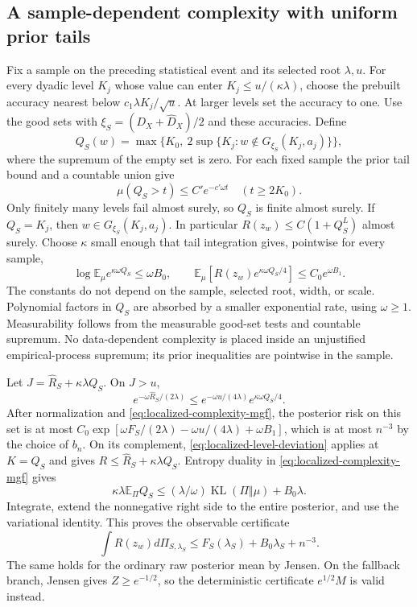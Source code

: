 \subsection{A sample-dependent complexity with uniform prior tails}
Fix a sample on the preceding statistical event and its selected root
$\lambda,u$. For every dyadic level $K_j$ whose value can enter
$K_j\le u/(\kappa\lambda)$, choose the prebuilt accuracy nearest below
$c_1\lambda K_j/\sqrt u$. At larger levels set the accuracy to one.
Use the good sets with $\xi_S=(D_X+\widehat D_X)/2$ and these accuracies.
Define
\[
 Q_S(w)=\max\{K_0,\ 2\sup\{K_j:w\notin G_{\xi_S}(K_j,a_j)\}\},
\]
where the supremum of the empty set is zero. For each fixed sample the
prior tail bound and a countable union give
\[
 \mu(Q_S>t)\le C'e^{-c'\omega t}\quad(t\ge2K_0).
\]
Only finitely many levels fail almost surely, so $Q_S$ is finite
almost surely. If $Q_S=K_j$, then $w\in G_{\xi_S}(K_j,a_j)$.
In particular $R(z_w)\le C(1+Q_S^L)$ almost surely.
Choose $\kappa$ small enough that tail integration gives, pointwise
for every sample,
\begin{equation}
 \log\mathbb E_\mu e^{\kappa\omega Q_S}\le\omega B_0,
 \qquad
 \mathbb E_\mu[R(z_w)e^{\kappa\omega Q_S/4}]
       \le C_0e^{\omega B_1}.
 \label{eq:localized-complexity-mgf}
\end{equation}
The constants do not depend on the sample, selected root, width, or
scale. Polynomial factors in $Q_S$ are absorbed by a smaller
exponential rate, using $\omega\ge1$.
Measurability follows from the measurable good-set tests and countable
supremum. No data-dependent complexity is placed inside an
unjustified empirical-process supremum; its prior inequalities are
pointwise in the sample.

Let $J=\widehat R_S+\kappa\lambda Q_S$. On $J>u$,
\[
 e^{-\omega\widehat R_S/(2\lambda)}
 \le e^{-\omega u/(4\lambda)}e^{\kappa\omega Q_S/4}.
\]
After normalization and \eqref{eq:localized-complexity-mgf}, the
posterior risk on this set is at most
$C_0\exp[\omega F_S/(2\lambda)-\omega u/(4\lambda)+\omega B_1]$,
which is at most $n^{-3}$ by the choice of $b_n$.
On its complement, \eqref{eq:localized-level-deviation} applies at
$K=Q_S$ and gives $R\le\widehat R_S+\kappa\lambda Q_S$.
Entropy duality in \eqref{eq:localized-complexity-mgf} gives
\[
 \kappa\lambda\mathbb E_\Pi Q_S
 \le(\lambda/\omega)\operatorname{KL}(\Pi\Vert\mu)+B_0\lambda.
\]
Integrate, extend the nonnegative right side to the entire posterior,
and use the variational identity. This proves the observable certificate
\begin{equation}
 \int R(z_w)d\Pi_{S,\lambda_S}
 \le F_S(\lambda_S)+B_0\lambda_S+n^{-3}.
 \label{eq:localized-certificate}
\end{equation}
The same holds for the ordinary raw posterior mean by Jensen. On the
fallback branch, Jensen gives $Z\ge e^{-1/2}$, so the deterministic
certificate $e^{1/2}M$ is valid instead.

